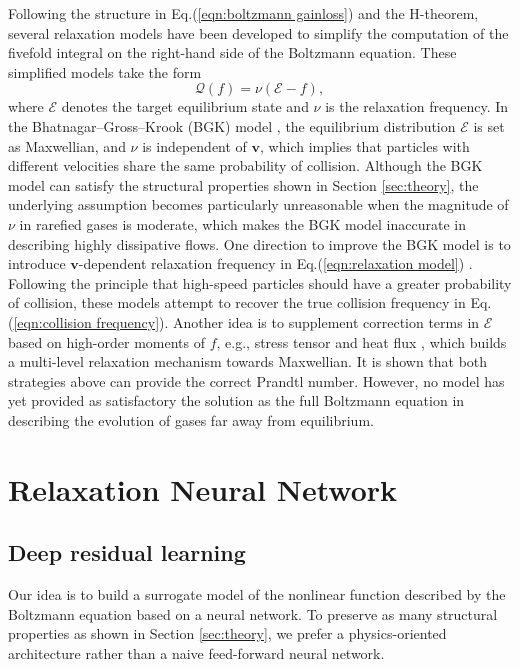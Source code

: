\documentclass[preprint,3p,12pt,sort&compress]{elsarticle}
\begin{document}
Following the structure in Eq.(\ref{eqn:boltzmann gainloss}) and the H-theorem, several relaxation models have been developed to simplify the computation of the fivefold integral on the right-hand side of the Boltzmann equation.
These simplified models take the form
\begin{equation}
    \mathcal Q(f) = \nu(\mathcal E - f),
    \label{eqn:relaxation model}
\end{equation}
where $\mathcal E$ denotes the target equilibrium state and $\nu$ is the relaxation frequency.
In the Bhatnagar–Gross–Krook (BGK) model \cite{bhatnagar1954model}, the equilibrium distribution $\mathcal E$ is set as Maxwellian, and $\nu$ is independent of $\mathbf v$, which implies that particles with different velocities share the same probability of collision.
Although the BGK model can satisfy the structural properties shown in Section \ref{sec:theory},
the underlying assumption becomes particularly unreasonable when the magnitude of $\nu$ in rarefied gases is moderate, which makes the BGK model inaccurate in describing highly dissipative flows.
One direction to improve the BGK model is to introduce $\mathbf v$-dependent relaxation frequency in Eq.(\ref{eqn:relaxation model}) \cite{mieussens2004numerical,haack2021consistent}.
Following the principle that high-speed particles should have a greater probability of collision, these models attempt to recover the true collision frequency in Eq.(\ref{eqn:collision frequency}).
Another idea is to supplement correction terms in $\mathcal E$ based on high-order moments of $f$, e.g., stress tensor \cite{holway1966new} and heat flux \cite{shakhov1968generalization}, which builds a multi-level relaxation mechanism towards Maxwellian.
It is shown that both strategies above can provide the correct Prandtl number.
However, no model has yet provided as satisfactory the solution as the full Boltzmann equation in describing the evolution of gases far away from equilibrium.

\section{Relaxation Neural Network}

\subsection{Deep residual learning}

Our idea is to build a surrogate model of the nonlinear function described by the Boltzmann equation based on a neural network.
To preserve as many structural properties as shown in Section \ref{sec:theory}, we prefer a physics-oriented architecture rather than a naive feed-forward neural network.
\end{document}
